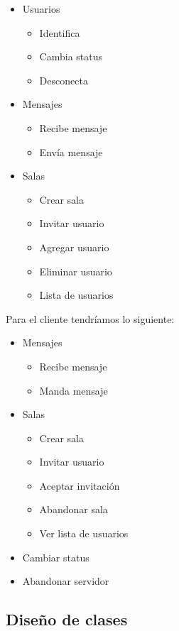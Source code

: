 \documentclass{article}
\begin{document}
\begin{itemize}
  \item Usuarios
  \begin{itemize}
    \item Identifica
    \item Cambia status
    \item Desconecta
  \end{itemize}
  \item Mensajes
  \begin{itemize}
    \item Recibe mensaje
    \item Envía mensaje
  \end{itemize}
  \item Salas
  \begin{itemize}
    \item Crear sala
    \item Invitar usuario
    \item Agregar usuario
    \item Eliminar usuario
    \item Lista de usuarios
  \end{itemize}
\end{itemize}

Para el cliente tendríamos lo siguiente:

\begin{itemize}
  \item Mensajes
  \begin{itemize}
    \item Recibe mensaje
    \item Manda mensaje
  \end{itemize}
  \item Salas
  \begin{itemize}
    \item Crear sala
    \item Invitar usuario
    \item Aceptar invitación
    \item Abandonar sala
    \item Ver lista de usuarios
  \end{itemize}
  \item Cambiar status
  \item Abandonar servidor
\end{itemize}

\subsection{Diseño de clases}
\end{document}
